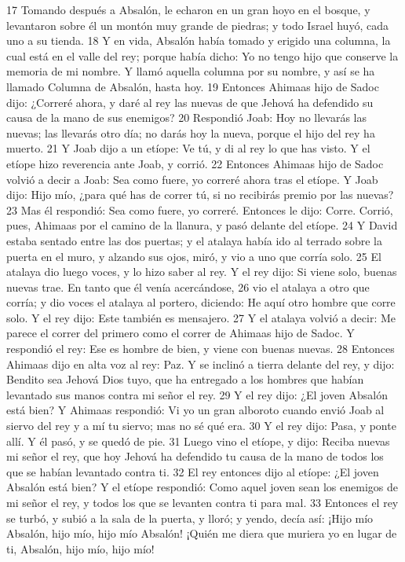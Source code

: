 17 Tomando después a Absalón, le echaron en un gran hoyo en el bosque, y levantaron sobre él un montón muy grande de piedras; y todo Israel huyó, cada uno a su tienda.
18 Y en vida, Absalón había tomado y erigido una columna, la cual está en el valle del rey; porque había dicho: Yo no tengo hijo que conserve la memoria de mi nombre. Y llamó aquella columna por su nombre, y así se ha llamado Columna de Absalón, hasta hoy.
19 Entonces Ahimaas hijo de Sadoc dijo: ¿Correré ahora, y daré al rey las nuevas de que Jehová ha defendido su causa de la mano de sus enemigos?
20 Respondió Joab: Hoy no llevarás las nuevas; las llevarás otro día; no darás hoy la nueva, porque el hijo del rey ha muerto.
21 Y Joab dijo a un etíope: Ve tú, y di al rey lo que has visto. Y el etíope hizo reverencia ante Joab, y corrió.
22 Entonces Ahimaas hijo de Sadoc volvió a decir a Joab: Sea como fuere, yo correré ahora tras el etíope. Y Joab dijo: Hijo mío, ¿para qué has de correr tú, si no recibirás premio por las nuevas?
23 Mas él respondió: Sea como fuere, yo correré. Entonces le dijo: Corre. Corrió, pues, Ahimaas por el camino de la llanura, y pasó delante del etíope.
24 Y David estaba sentado entre las dos puertas; y el atalaya había ido al terrado sobre la puerta en el muro, y alzando sus ojos, miró, y vio a uno que corría solo.
25 El atalaya dio luego voces, y lo hizo saber al rey. Y el rey dijo: Si viene solo, buenas nuevas trae. En tanto que él venía acercándose,
26 vio el atalaya a otro que corría; y dio voces el atalaya al portero, diciendo: He aquí otro hombre que corre solo. Y el rey dijo: Este también es mensajero.
27 Y el atalaya volvió a decir: Me parece el correr del primero como el correr de Ahimaas hijo de Sadoc. Y respondió el rey: Ese es hombre de bien, y viene con buenas nuevas.
28 Entonces Ahimaas dijo en alta voz al rey: Paz. Y se inclinó a tierra delante del rey, y dijo: Bendito sea Jehová Dios tuyo, que ha entregado a los hombres que habían levantado sus manos contra mi señor el rey.
29 Y el rey dijo: ¿El joven Absalón está bien? Y Ahimaas respondió: Vi yo un gran alboroto cuando envió Joab al siervo del rey y a mí tu siervo; mas no sé qué era.
30 Y el rey dijo: Pasa, y ponte allí. Y él pasó, y se quedó de pie.
31 Luego vino el etíope, y dijo: Reciba nuevas mi señor el rey, que hoy Jehová ha defendido tu causa de la mano de todos los que se habían levantado contra ti.
32 El rey entonces dijo al etíope: ¿El joven Absalón está bien? Y el etíope respondió: Como aquel joven sean los enemigos de mi señor el rey, y todos los que se levanten contra ti para mal.
33 Entonces el rey se turbó, y subió a la sala de la puerta, y lloró; y yendo, decía así: ¡Hijo mío Absalón, hijo mío, hijo mío Absalón! ¡Quién me diera que muriera yo en lugar de ti, Absalón, hijo mío, hijo mío! 

